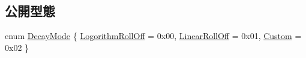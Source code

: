 \subsection*{公開型態}
\begin{DoxyCompactItemize}
\item 
enum \hyperlink{class_magnum_1_1_audio_source_base_ab34de5e5b3170a8f0fce85ac723577c9}{Decay\+Mode} \{ \hyperlink{class_magnum_1_1_audio_source_base_ab34de5e5b3170a8f0fce85ac723577c9a7ee33a72cfd53d68f22368795e4e9ef2}{Logorithm\+Roll\+Off} = 0x00, 
\hyperlink{class_magnum_1_1_audio_source_base_ab34de5e5b3170a8f0fce85ac723577c9a0ca9b0bbcd84ae70ccac071fcb4da366}{Linear\+Roll\+Off} = 0x01, 
\hyperlink{class_magnum_1_1_audio_source_base_ab34de5e5b3170a8f0fce85ac723577c9ab735e1ed4e8adb0637680f123d3ce646}{Custom} = 0x02
 \}
\end{DoxyCompactItemize}
